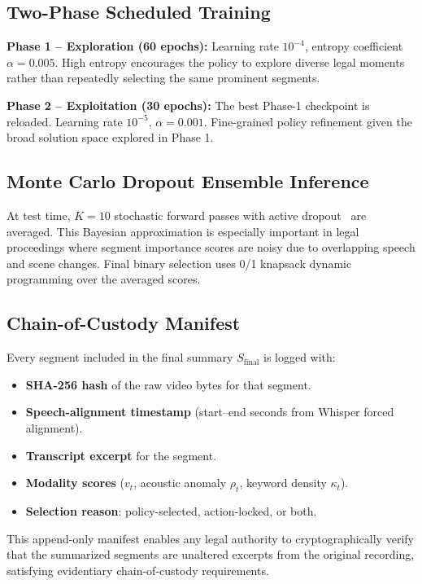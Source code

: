 \documentclass[letterpaper]{article} %
\begin{document}
\subsection{Two-Phase Scheduled Training}

\textbf{Phase 1 -- Exploration (60 epochs):} Learning rate $10^{-4}$, entropy coefficient $\alpha = 0.005$. High entropy encourages the policy to explore diverse legal moments rather than repeatedly selecting the same prominent segments.

\textbf{Phase 2 -- Exploitation (30 epochs):} The best Phase-1 checkpoint is reloaded. Learning rate $10^{-5}$, $\alpha = 0.001$. Fine-grained policy refinement given the broad solution space explored in Phase 1.

\subsection{Monte Carlo Dropout Ensemble Inference}

At test time, $K = 10$ stochastic forward passes with active dropout~\cite{gal2016dropout} are averaged. This Bayesian approximation is especially important in legal proceedings where segment importance scores are noisy due to overlapping speech and scene changes. Final binary selection uses 0/1 knapsack dynamic programming over the averaged scores.

\subsection{Chain-of-Custody Manifest}

Every segment included in the final summary $S_{\text{final}}$ is logged with:
\begin{itemize}
    \item \textbf{SHA-256 hash} of the raw video bytes for that segment.
    \item \textbf{Speech-alignment timestamp} (start--end seconds from Whisper forced alignment).
    \item \textbf{Transcript excerpt} for the segment.
    \item \textbf{Modality scores} ($v_t$, acoustic anomaly $\rho_t$, keyword density $\kappa_t$).
    \item \textbf{Selection reason}: policy-selected, action-locked, or both.
\end{itemize}
This append-only manifest enables any legal authority to cryptographically verify that the summarized segments are unaltered excerpts from the original recording, satisfying evidentiary chain-of-custody requirements.
\end{document}

